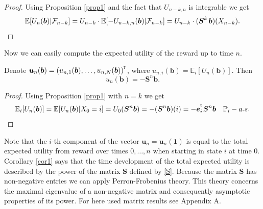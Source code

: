\begin{proof}
Using Proposition \ref{prop1} and the fact that $U_{n-k,n}$ is integrable we get 
\[\mathbb{E}[U_n(\mbox{\boldmath{$b$}})|\mathcal{F}_{n-k}]=U_{n-k}\cdot\mathbb{E}[-U_{n-k,n}(\mbox{\boldmath{$b$}})|\mathcal{F}_{n-k}]=U_{n-k}\cdot (\mbox{\boldmath{$S$}}^k\,\mbox{\boldmath{$b$}})(X_{n-k}). \qedhere\]
\end{proof}
Now we can easily compute the expected utility of the reward up to time $n$.
\begin{cor} 
\label{cor1}
Denote $\mbox{\boldmath{$u$}}_n(\mbox{\boldmath{$b$}})=(u_{n,1}(\mbox{\boldmath{$b$}}),\dots,u_{n,N}(\mbox{\boldmath{$b$}}))^{^{_\texttt T}}$, where $u_{n,i}(\bm{b})=\mathbb{E}_i[U_n(\bm{b})]$. Then
$$u_n(\bm{b})=-\bm{S}^n\bm{b}.$$
\end{cor}
\begin{proof}
Using Proposition \ref{prop1} with $n=k$ we get
\[\mathbb{E}_i[U_n(\mbox{\boldmath{$b$}})]=\mathbb{E}[U_n(\mbox{\boldmath{$b$}})|X_0=i]=U_0(\mbox{\boldmath{$S$}}^n\mbox{\boldmath{$b$}})=-(\mbox{\boldmath{$S$}}^n\mbox{\boldmath{$b$}})(i)=-\mbox{\boldmath{$e$}}_i^{^{_\texttt T}}\mbox{\boldmath{$S$}}^n\mbox{\boldmath{$b$}}\quad \mathbb{P}_i - a.s.\qedhere\]
\end{proof}
Note that the $i$-th component of the vector $\bm{u}_n=\bm{u}_n(\bm{1})$ is equal to the total expected utility from reward over times $0,\dots,n$ when starting in state $i$ at time $0$. Corollary \ref{cor1} says that the time development of the total expected utility is described by the power of the matrix $\bm{S}$ defined by \eqref{S}.  %
Because the matrix $\bm{S}$ has non-negative entries we can apply Perron-Frobenius theory. This theory concerns the maximal eigenvalue of a non-negative matrix and consequently asymptotic properties of its power. For here used matrix results see Appendix A.

